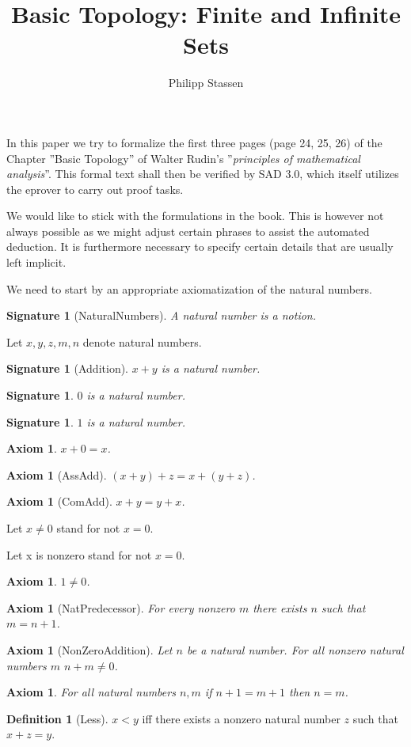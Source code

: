 \documentclass[10pt]{article}
\title{Basic Topology: Finite and Infinite Sets}
\author{Philipp Stassen}
\newenvironment{forthel}{\begin{leftbar}}{\end{leftbar}}
\theoremstyle{definition}
\newtheorem{definition}[theorem]{Definition}
\theoremstyle{plain}
\newtheorem{signature}[theorem]{Signature}
\newtheorem{axiom}[theorem]{Axiom}
\theoremstyle{remark}
\begin{document}
\maketitle
In this paper we try to formalize the first three pages (page 24, 25, 26) of the Chapter ''Basic Topology'' of Walter Rudin's ''\emph{principles of mathematical analysis}''. 
This formal text shall then be verified by SAD 3.0, which itself utilizes the eprover to carry out proof tasks.

We would like to stick with the formulations in the book. This is however not always possible as we might adjust certain phrases to assist the automated deduction. It is furthermore necessary to specify certain details that are usually left implicit.

We need to start by an appropriate axiomatization of the natural numbers.
\begin{forthel}
[set/-s] [element/-s] [subset/-s] [sequence/-s] [number/-s]
	\begin{signature}[NaturalNumbers]
		A natural number is a notion.
	\end{signature}
	Let $x,y,z,m,n$ denote natural numbers.
	\begin{signature}[Addition]
		$x + y$ is a natural number.
	\end{signature}
	\begin{signature}
		$0$ is a natural number.
	\end{signature}
	\begin{signature}
		$1$ is a natural number.
	\end{signature}
	\begin{axiom}
		$x + 0 = x$.
	\end{axiom}
	\begin{axiom}[AssAdd]
	 	$(x+y)+z=x+(y+z)$.
	\end{axiom}
	\begin{axiom}[ComAdd]
		$x+y=y+x$.
	\end{axiom}
	Let $x \neq 0$ stand for not $x=0$.

	Let x is nonzero stand for not $x=0$.
	\begin{axiom}
		$1 \neq 0$.
	\end{axiom}
	\begin{axiom}[NatPredecessor]
		For every nonzero $m$ there exists $n$ such that $m = n+1$.
	\end{axiom}
	\begin{axiom}[NonZeroAddition]
		Let $n$ be a natural number. For all nonzero natural numbers $m$ $n+m \neq 0$.
	\end{axiom}
	\begin{axiom}
		For all natural numbers $n,m$ if $n+1=m+1$ then $n=m$.
	\end{axiom}
	\begin{definition}[Less]
		$x<y$ iff there exists a nonzero natural number $z$ such that $x+z=y$.
	\end{definition}
\end{forthel}
\end{document}
